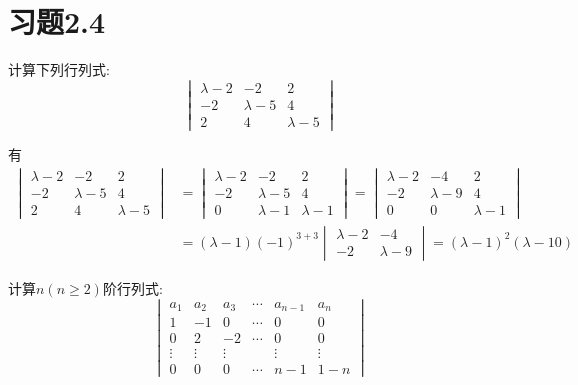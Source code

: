 \documentclass{ctexart}
\begin{document}
\section*{习题2.4}
\begin{homework}[1(3)]
    计算下列行列式:
    \[\begin{vmatrix}
        \lambda-2&-2&2\\
        -2&\lambda-5&4\\
        2&4&\lambda-5
    \end{vmatrix}\]
\end{homework}
\begin{solution}
    有
    \[\begin{aligned}
        \begin{vmatrix}
            \lambda-2&-2&2\\
            -2&\lambda-5&4\\
            2&4&\lambda-5
        \end{vmatrix}
        &=  \begin{vmatrix}
                \lambda-2&-2&2\\
                -2&\lambda-5&4\\
                0&\lambda-1&\lambda-1
            \end{vmatrix} = 
            \begin{vmatrix}
                \lambda-2&-4&2\\
                -2&\lambda-9&4\\
                0&0&\lambda-1
            \end{vmatrix} \\
        &= (\lambda-1)(-1)^{3+3}\begin{vmatrix}
                \lambda-2&-4\\
                -2&\lambda-9
            \end{vmatrix} = (\lambda-1)^2(\lambda-10)
    \end{aligned}\]
\end{solution}
\begin{homework}[2]
    计算$n(n\geqslant2)$阶行列式:
    \[\begin{vmatrix}
        a_1&a_2&a_3&\cdots&a_{n-1}&a_n\\
        1&-1&0&\cdots&0&0\\
        0&2&-2&\cdots&0&0\\
        \vdots&\vdots&\vdots& &\vdots&\vdots\\
        0&0&0&\cdots&n-1&1-n
    \end{vmatrix}\]
\end{homework}
\end{document}
